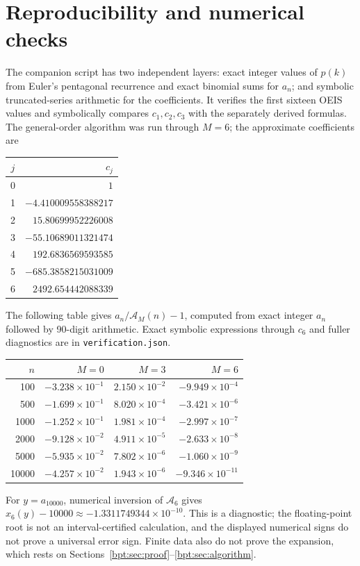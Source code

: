 \documentclass[11pt]{article}
\theoremstyle{remark}\newtheorem{remark}[theorem]{Remark}
\begin{document}
\section{Reproducibility and numerical checks}
The companion script has two independent layers: exact integer values of $p(k)$ from Euler's pentagonal recurrence and exact binomial sums for $a_n$; and symbolic truncated-series arithmetic for the coefficients. It verifies the first sixteen OEIS values and symbolically compares $c_1,c_2,c_3$ with the separately derived formulas. The general-order algorithm was run through $M=6$; the approximate coefficients are
\begin{center}
\begin{tabular}{cr}\toprule
$j$ & $c_j$ \\\midrule
0 & $1$\\
1 & $-4.410009558388217$\\
2 & $15.80699952226008$\\
3 & $-55.10689011321474$\\
4 & $192.6836569593585$\\
5 & $-685.3858215031009$\\
6 & $2492.654442088339$\\\bottomrule
\end{tabular}
\end{center}
The following table gives $a_n/\mathcal A_M(n)-1$, computed from exact integer $a_n$ followed by 90-digit arithmetic. Exact symbolic expressions through $c_6$ and fuller diagnostics are in \texttt{verification.json}.
\begin{center}
\begin{tabular}{rrrr}\toprule
$n$ & $M=0$ & $M=3$ & $M=6$\\\midrule
100 & $-3.238\times10^{-1}$ & $2.150\times10^{-2}$ & $-9.949\times10^{-4}$\\
500 & $-1.699\times10^{-1}$ & $8.020\times10^{-4}$ & $-3.421\times10^{-6}$\\
1000 & $-1.252\times10^{-1}$ & $1.981\times10^{-4}$ & $-2.997\times10^{-7}$\\
2000 & $-9.128\times10^{-2}$ & $4.911\times10^{-5}$ & $-2.633\times10^{-8}$\\
5000 & $-5.935\times10^{-2}$ & $7.802\times10^{-6}$ & $-1.060\times10^{-9}$\\
10000 & $-4.257\times10^{-2}$ & $1.943\times10^{-6}$ & $-9.346\times10^{-11}$\\
\bottomrule\end{tabular}
\end{center}
For $y=a_{10000}$, numerical inversion of $\mathcal A_6$ gives
$x_6(y)-10000\approx-1.3311749344\times10^{-10}$.
This is a diagnostic; the floating-point root is not an interval-certified calculation, and the displayed numerical signs do not prove a universal error sign. Finite data also do not prove the expansion, which rests on Sections~\ref{bpt:sec:proof}--\ref{bpt:sec:algorithm}.
\end{document}
